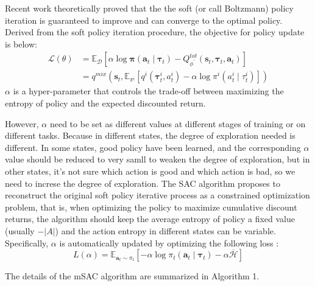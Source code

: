 \documentclass[runningheads]{llncs}
\begin{document}
Recent work theoretically proved that the the soft (or call Boltzmann) policy iteration is guaranteed to improve and can converge to the optimal policy. Derived from the soft policy iteration procedure, the objective for policy update is below: 
\begin{align}
	\mathcal{L}(\theta)&= \mathbb{E}_{\mathcal{D}}\left[ \alpha \log \boldsymbol{\pi}\left(\boldsymbol{a}_{t} \mid \boldsymbol{\tau}_{t}\right)-Q^{t o t}_{\phi^{\prime}}\left(\boldsymbol{s}_{t},\boldsymbol{\tau}_{t}, \boldsymbol{a}_{t} \right) \right]\\
	&=q^{mix}(\boldsymbol{s}_{t},\mathbb{E}_{{\pi}^{i}} \left[ q^{i}\left(\boldsymbol{\tau}^{i}_{t}, a^{i}_{t}\right)-\alpha \log \pi^{i}\left(a^{i}_{t} \mid \tau^{i}_{t}\right)\right])
\end{align}
$\alpha$ is a hyper-parameter that controls the trade-off between maximizing the entropy of policy and the expected discounted return. 


However, $\alpha$ need to be set as different values  at different stages of training or on different tasks. Because in different states, the degree of exploration needed is different. In some states, good policy have been learned, and the corresponding $\alpha$ value should be reduced to very samll to weaken the degree of exploration, but in other states, it's not sure which action is good and which action is bad, so we need to increse the degree of exploration. The SAC algorithm proposes to reconstruct the original soft policy iterative process as a constrained optimization problem, that is, when optimizing the policy to maximize cumulative discount returns, the algorithm should keep the average entropy of policy a fixed value (usually $-|A|$) and the action entropy in different states can be variable.  Specifically, $\alpha$ is automatically updated by optimizing the following loss \cite{b11}:
\begin{equation}
	L(\alpha)=\mathbb{E}_{\mathbf{a}_{t} \sim \pi_{t}}\left[-\alpha \log \pi_{t}\left(\mathbf{a}_{t} \mid \mathbf{\tau}_{t}\right)-\alpha \overline{\mathcal{H}}\right]
\end{equation}

The details of the mSAC algorithm are summarized in Algorithm 1.
\end{document}
